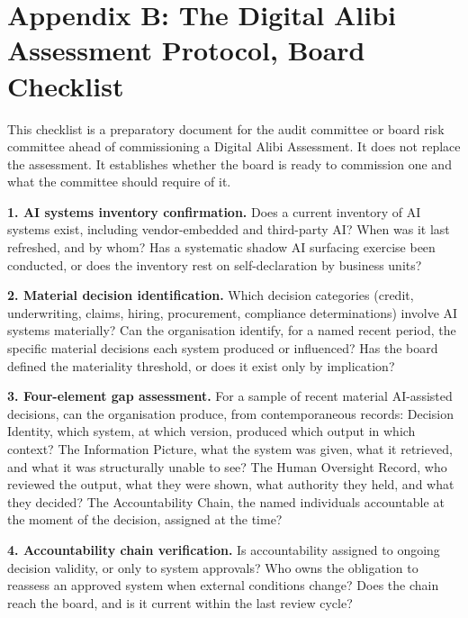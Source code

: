 
\chapter*{Appendix B: The Digital Alibi Assessment Protocol, Board Checklist}

This checklist is a preparatory document for the audit committee or board risk committee ahead of commissioning a Digital Alibi Assessment. It does not replace the assessment. It establishes whether the board is ready to commission one and what the committee should require of it.

\textbf{1. AI systems inventory confirmation.} Does a current inventory of AI systems exist, including vendor-embedded and third-party AI? When was it last refreshed, and by whom? Has a systematic shadow AI surfacing exercise been conducted, or does the inventory rest on self-declaration by business units?

\textbf{2. Material decision identification.} Which decision categories (credit, underwriting, claims, hiring, procurement, compliance determinations) involve AI systems materially? Can the organisation identify, for a named recent period, the specific material decisions each system produced or influenced? Has the board defined the materiality threshold, or does it exist only by implication?

\textbf{3. Four-element gap assessment.} For a sample of recent material AI-assisted decisions, can the organisation produce, from contemporaneous records: Decision Identity, which system, at which version, produced which output in which context? The Information Picture, what the system was given, what it retrieved, and what it was structurally unable to see? The Human Oversight Record, who reviewed the output, what they were shown, what authority they held, and what they decided? The Accountability Chain, the named individuals accountable at the moment of the decision, assigned at the time?

\textbf{4. Accountability chain verification.} Is accountability assigned to ongoing decision validity, or only to system approvals? Who owns the obligation to reassess an approved system when external conditions change? Does the chain reach the board, and is it current within the last review cycle?


